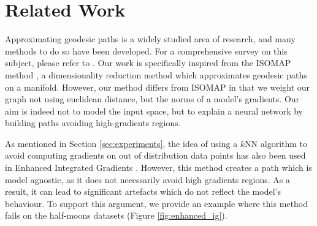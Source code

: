 \section{Related Work}
\label{sec:related_work}

Approximating geodesic paths is a widely studied area of research, and many methods to do so have been developed. For a comprehensive survey on this subject, please refer to \citet{crane2020survey}. Our work is specifically inspired from the ISOMAP method \citep{tenenbaum2000global}, a dimensionality reduction method which approximates geodesic paths on a manifold. However, our method differs from ISOMAP in that we weight our graph not using euclidean distance, but the norms of a model's gradients. Our aim is indeed not to model the input space, but to explain a neural network by building paths avoiding high-gradients regions.

As mentioned in Section \ref{sec:experiments}, the idea of using a $k$NN algorithm to avoid computing gradients on out of distribution data points has also been used in Enhanced Integrated Gradients \citet{jha2020enhanced}. However, this method creates a path which is model agnostic, as it does not necessarily avoid high gradients regions. As a result, it can lead to significant artefacts which do not reflect the model's behaviour. To support this argument, we provide an example where this method fails on the half-moons datasets (Figure \ref{fig:enhanced_ig}). 


